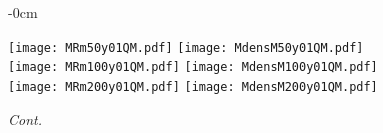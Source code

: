 \documentclass[universe,article,accept,moreauthors,pdftex]{Definitions/mdpi}
\begin{document}
\begin{figure}[H]\ContinuedFloat

\begin{adjustwidth}{-\extralength}{0cm}
\centering %

{\texttt{[image: MRm50y01QM.pdf]}
	  \texttt{[image: MdensM50y01QM.pdf]}}\\
{\texttt{[image: MRm100y01QM.pdf]}
	  \texttt{[image: MdensM100y01QM.pdf]}}\\
{\texttt{[image: MRm200y01QM.pdf]}
	  \texttt{[image: MdensM200y01QM.pdf]}}\\
\end{adjustwidth}
\caption{\emph{Cont.}}
\label{fig:MRdens01QM}

\end{figure}
\end{document}
